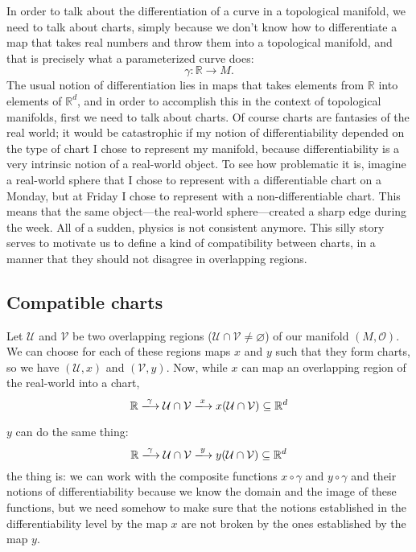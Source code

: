 In order to talk about the differentiation of a curve in a topological manifold, we need to talk about charts, simply because we don't know how to differentiate a map that takes real numbers and throw them into a topological manifold, and that is precisely what a parameterized curve does:
\[
    \gamma : \mathbb{R} \longrightarrow M.
\]
The usual notion of differentiation lies in maps that takes elements from $\mathbb{R}$ into elements of $\mathbb{R}^d$, and in order to accomplish this in the context of topological manifolds, first we need to talk about charts. Of course charts are fantasies of the real world; it would be catastrophic if my notion of differentiability depended on the type of chart I chose to represent my manifold, because differentiability is a very intrinsic notion of a real-world object. To see how problematic it is, imagine a real-world sphere that I chose to represent with a differentiable chart on a Monday, but at Friday I chose to represent with a non-differentiable chart. This means that the same object---the real-world sphere---created a sharp edge during the week. All of a sudden, physics is not consistent anymore. This silly story serves to motivate us to define a kind of compatibility between charts, in a manner that they should not disagree in overlapping regions.

\subsection{Compatible charts}
Let $\mathcal{U}$ and $\mathcal{V}$ be two overlapping regions ($\mathcal{U} \cap \mathcal{V} \neq \varnothing$) of our manifold $(M, \mathcal{O})$. We can choose for each of these regions maps $x$ and $y$ such that they form charts, so we have $(\mathcal{U}, x)$ and $(\mathcal{V}, y)$. Now, while $x$ can map an overlapping region of the real-world into a chart,
%
\begin{equation*}
    \mathbb{R} \xlongrightarrow[]{\gamma} \mathcal{U} \cap \mathcal{V}  \xlongrightarrow[]{x} x(\mathcal{U} \cap \mathcal{V} ) \subseteq \mathbb{R}^d
\end{equation*}

$y$ can do the same thing:
%
\begin{equation*}
    \mathbb{R} \xlongrightarrow[]{\gamma} \mathcal{U} \cap \mathcal{V} \xlongrightarrow[]{y} y(\mathcal{U} \cap \mathcal{V} ) \subseteq \mathbb{R}^d
\end{equation*}
%
the thing is: we can work with the composite functions $x \circ \gamma$ and $y \circ \gamma$ and their notions of differentiability because we know the domain and the image of these functions, but we need somehow to make sure that the notions established in the differentiability level by the map $x$ are not broken by the ones established by the map $y$.

